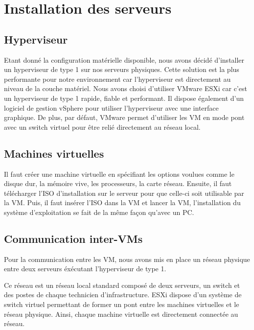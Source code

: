 \section{Installation des serveurs}
	\subsection{Hyperviseur}
Etant donné la configuration matérielle disponible, nous avons décidé d’installer un hyperviseur de type 1 sur nos serveurs physiques. Cette solution est la plus performante pour notre environnement car l’hyperviseur est directement au niveau de la couche matériel. Nous avons choisi d’utiliser VMware ESXi car c’est un hyperviseur de type 1 rapide, fiable et performant. Il dispose également d’un logiciel de gestion vSphere pour utiliser l’hyperviseur avec une interface graphique. De plus, par défaut, VMware permet d’utiliser les VM en mode pont avec un switch virtuel pour être relié directement au réseau local.

	\subsection{Machines virtuelles}
Il faut créer une machine virtuelle en spécifiant les options voulues comme le disque dur, la mémoire vive, les processeurs, la carte réseau. Ensuite, il faut télécharger l’ISO d’installation sur le serveur pour que celle-ci soit utilisable par la VM. Puis, il faut insérer l’ISO dans la VM et lancer la VM, l’installation du système d’exploitation se fait de la même façon qu’avec un PC.

	\subsection{Communication inter-VMs}

Pour la communication entre les VM, nous avons mis en place un réseau physique entre deux serveurs éxécutant l'hyperviseur de type 1.

Ce réseau est un réseau local standard composé de deux serveurs, un switch et des postes de chaque technicien d'infrastructure.
ESXi dispose d'un système de switch virtuel permettant de former un pont entre les machines virtuelles et le réseau physique.
Ainsi, chaque machine virtuelle est directement connectée au réseau.

